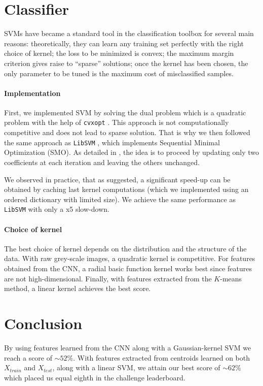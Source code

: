 \documentclass{article} %
\begin{document}
\section{Classifier}
SVMs \cite{Burges1998} have became a standard tool in the classification toolbox for several main reasons: theoretically, they can learn any training set perfectly with the right choice of kernel; the loss to be minimized is convex; the maximum margin criterion gives raise to “sparse” solutions; once the kernel has been chosen, the only parameter to be tuned is the maximum cost of misclassified samples. 

\paragraph{Implementation}

First, we implemented SVM by solving the dual problem which is a quadratic problem with the help of \texttt{cvxopt} \cite{cvxopt}. This approach is not computationally competitive and does not lead to sparse solution. That is why we then followed the same approach as \texttt{LibSVM} \cite{Chang:2011}, which implements Sequential Minimal Optimization (SMO). As detailed in \cite{Bottou06supportvector}, the idea is to proceed by updating only two coefficients at each iteration and leaving the others unchanged.

We observed in practice, that as suggested, a significant speed-up can be obtained by caching last kernel computations (which we implemented using an ordered dictionary with limited size). We achieve the same performance as \texttt{LibSVM} with only a x5 slow-down.

\paragraph{Choice of kernel}
The best choice of kernel depends on the distribution and the structure of the data. With raw grey-scale images, a quadratic kernel is competitive. For features obtained from the CNN, a radial basic function kernel works best since features are not high-dimensional. Finally, with features extracted from the $K$-means method, a linear kernel achieves the best score.

\section{Conclusion}
By using features learned from the CNN along with a Gaussian-kernel SVM we reach a score of $\sim 52\%$. With features extracted from centroids learned on both $X_{train}$ and $X_{test}$, along with a linear SVM, we attain our best score of $\sim 62\%$ which placed us equal eighth in the challenge leaderboard.



\end{document}
